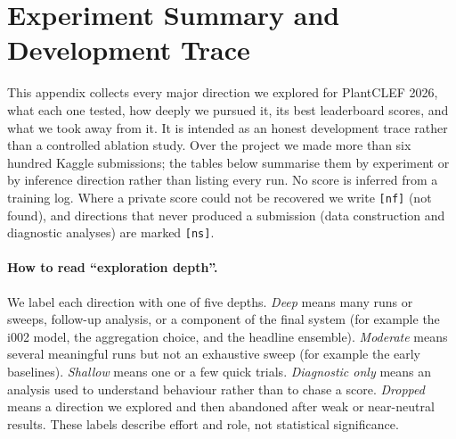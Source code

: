 
\appendix
\section{Experiment Summary and Development Trace}
\label{app:experiment_summary}

This appendix collects every major direction we explored for PlantCLEF 2026, what
each one tested, how deeply we pursued it, its best leaderboard scores, and what we
took away from it. It is intended as an honest development trace rather than a
controlled ablation study. Over the project we made more than six hundred Kaggle
submissions; the tables below summarise them by experiment or by inference direction
rather than listing every run. No score is inferred
from a training log. Where a private score could not be recovered we write
\texttt{[nf]} (not found), and directions that never produced a submission (data
construction and diagnostic analyses) are marked \texttt{[ns]}.

\paragraph{How to read ``exploration depth''.}
We label each direction with one of five depths.
\emph{Deep} means many runs or sweeps, follow-up analysis, or a component of the
final system (for example the i002 model, the aggregation choice, and the headline
ensemble). \emph{Moderate} means several meaningful runs but not an exhaustive sweep
(for example the early baselines). \emph{Shallow} means one or a few quick trials.
\emph{Diagnostic only} means an analysis used to understand behaviour rather than to
chase a score. \emph{Dropped} means a direction we explored and then abandoned after
weak or near-neutral results. These labels describe effort and role, not statistical
significance.

